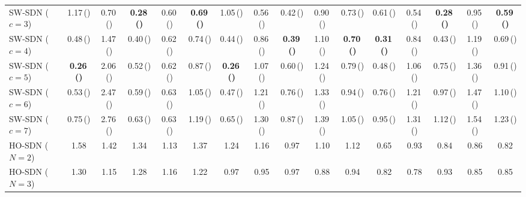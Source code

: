 \documentclass[conference]{IEEEtran}
\begin{document}
\begin{table}[tbh]
\begin{tabular}{l ccccc | ccccc | ccccc}
        SW-SDN ($c=3$)
            & 1.17\,() & 0.70\,() & \textbf{0.28\,()} & 0.60\,() & \textbf{0.69\,()} 
            & 1.05\,() & 0.56\,() & 0.42\,() & 0.90\,() & 0.73\,() 
            & 0.61\,() & 0.54\,() & \textbf{0.28\,()} & 0.95\,() & \textbf{0.59\,()} \\
            
        SW-SDN ($c=4$)
            & 0.48\,() & 1.47\,() & 0.40\,() & 0.62\,() & 0.74\,() 
            & 0.44\,() & 0.86\,() & \textbf{0.39\,()} & 1.10\,() & \textbf{0.70\,()} 
            & \textbf{0.31\,()} & 0.84\,() & 0.43\,() & 1.19\,() & 0.69\,() \\
            
        SW-SDN ($c=5$)
            & \textbf{0.26\,()} & 2.06\,() & 0.52\,() & 0.62\,() & 0.87\,() 
            & \textbf{0.26\,()} & 1.07\,() & 0.60\,() & 1.24\,() & 0.79\,() 
            & 0.48\,() & 1.06\,() & 0.75\,() & 1.36\,() & 0.91\,() \\
            
        SW-SDN ($c=6$)
            & 0.53\,() & 2.47\,() & 0.59\,() & 0.63\,() & 1.05\,() 
            & 0.47\,() & 1.21\,() & 0.76\,() & 1.33\,() & 0.94\,() 
            & 0.76\,() & 1.21\,() & 0.97\,() & 1.47\,() & 1.10\,() \\
            
        SW-SDN ($c=7$)
            & 0.75\,() & 2.76\,() & 0.63\,() & 0.63\,() & 1.19\,() 
            & 0.65\,() & 1.30\,() & 0.87\,() & 1.39\,() & 1.05\,() 
            & 0.95\,() & 1.31\,() & 1.12\,() & 1.54\,() & 1.23\,() \\
        \midrule
        
        HO-SDN ($N=2$)
            & 1.58 & 1.42 & 1.34 & 1.13 & 1.37 
            & 1.24 & 1.16 & 0.97 & 1.10 & 1.12 
            & 0.65 & 0.93 & 0.84 & 0.86 & 0.82 \\
            
        HO-SDN ($N=3$)
            & 1.30 & 1.15 & 1.28 & 1.16 & 1.22 
            & 0.97 & 0.95 & 0.97 & 0.88 & 0.94 
            & 0.82 & 0.78 & 0.93 & 0.85 & 0.85 \\
        \bottomrule
    \end{tabular}
\end{table}
\end{document}
